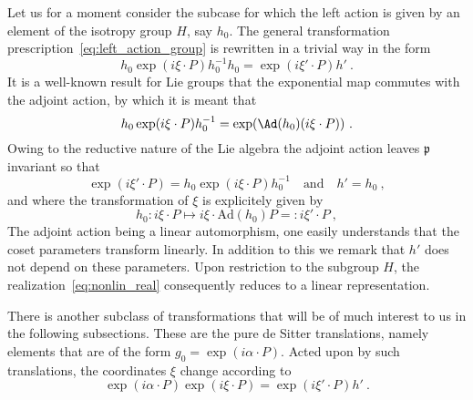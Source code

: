 \documentclass[11pt]{article}
\begin{document}
Let us for a moment consider the subcase for which the left 
action is given by an element of the isotropy group $H$, say 
$h_0$. The general transformation 
prescription~\eqref{eq:left_action_group} is rewritten in a 
trivial way in the form
%
\begin{displaymath}
	h_0 \exp(i\xi\cdot P) h_0^{-1}h_0 = \exp(i\xi'\cdot P) h'~.
\end{displaymath}
It is a well-known result for Lie groups that the exponential map 
commutes with the adjoint action, by which it is meant that 
\begin{displaymath}
	h_0 \exp(i\xi\cdot P) h_0^{-1} = \exp( \Ad(h_0)(i\xi\cdot 
	P))~.
\end{displaymath}
Owing to the reductive nature of the Lie algebra the adjoint 
action leaves $\mathfrak{p}$ invariant so that
\begin{displaymath}
	\exp(i\xi'\cdot P) = h_0\exp(i\xi\cdot P)h_0^{-1}\quad
	\text{and}\quad
	h' = h_0~,
\end{displaymath}
and where the transformation of $\xi$ is explicitely given by
\begin{displaymath}
	h_{0}: i\xi\cdot P \mapsto i\xi\cdot \mathrm{Ad}(h_0)P =: 
	i\xi'\cdot P~,
\end{displaymath}
The adjoint action being a linear automorphism, one easily 
understands that the coset parameters transform linearly. In 
addition to this we remark that $h'$ does not depend on these 
parameters.  Upon restriction to the subgroup $H$, the 
realization~\eqref{eq:nonlin_real} consequently reduces to a 
linear representation.

There is another subclass of transformations that will be of much 
interest to us in the following subsections. These are the pure 
de Sitter translations, namely elements that are of the form $g_0 
= \exp(i\alpha\cdot P)$.  Acted upon by such translations, the 
coordinates $\xi$ change according to
\begin{equation}\label{eq:left_action_coset}
	\exp(i\alpha\cdot P)\exp(i\xi\cdot P) = \exp(i\xi'\cdot P)h'~.
\end{equation}
\end{document}
